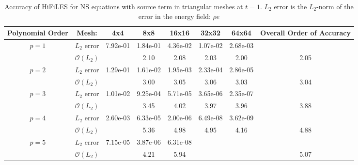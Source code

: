 \begin{table}[htbp]
\centering
\begin{tabular}{ c c c c c c c c} 
  
 Polynomial Order & Mesh: & 4x4 & 8x8 & 16x16 & 32x32 & 64x64 & Overall Order of Accuracy \\ 
 \hline 
 \multirow{2}{*}{$p = 1$} & $L_2$ error & 7.92e-01 & 1.84e-01 & 4.36e-02 & 1.07e-02 & 2.68e-03 &   \\ 
  
   & $\mathcal{O}(L_2)$ &   & 2.10 & 2.08 & 2.03 & 2.00 & 2.05 \\ 
 \hline 
 \multirow{2}{*}{$p = 2$} & $L_2$ error & 1.29e-01 & 1.61e-02 & 1.95e-03 & 2.33e-04 & 2.86e-05 &   \\ 
  
   & $\mathcal{O}(L_2)$ &   & 3.00 & 3.05 & 3.06 & 3.03 & 3.04 \\ 
 \hline 
 \multirow{2}{*}{$p = 3$} & $L_2$ error & 1.01e-02 & 9.25e-04 & 5.71e-05 & 3.65e-06 & 2.35e-07 &   \\ 
  
   & $\mathcal{O}(L_2)$ &   & 3.45 & 4.02 & 3.97 & 3.96 & 3.88 \\ 
 \hline 
 \multirow{2}{*}{$p = 4$} & $L_2$ error & 2.60e-03 & 6.33e-05 & 2.00e-06 & 6.49e-08 & 3.62e-09 &   \\ 
  
   & $\mathcal{O}(L_2)$ &   & 5.36 & 4.98 & 4.95 & 4.16 & 4.88 \\ 
 \hline 
 \multirow{2}{*}{$p = 5$} & $L_2$ error & 7.15e-05 & 3.87e-06 & 6.31e-08 &   &   &   \\ 
  
   & $\mathcal{O}(L_2)$ &   & 4.21 & 5.94 &   &   & 5.07 \\ 
 \hline 
 \end{tabular}
\caption{Accuracy of HiFiLES for NS equations with source term in triangular meshes at $t = 1$. $L_2$ error is the $L_2$-norm of the error in the energy field: $\rho e$}
\label{table:trisError1} 
 \end{table}
